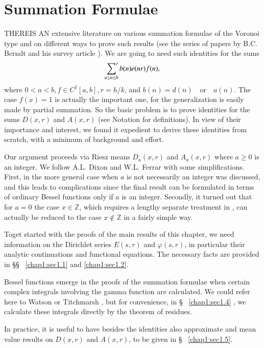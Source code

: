 
\chapter{Summation Formulae}\label{chap1}

THERE\pageoriginale IS AN extensive literature on various summation
formulae of the Voronoi type and on different ways to prove such
results (see \eg the series of papers by B.C. Berndt \cite{key3} and
his survey article \cite{key4}). We are going to need such identities
for the sums
$$
\sideset{}{'}\sum\limits_{a\leq n\leq b}b(n)e(nr)f(n),
$$
where $0<a<b, f\in C^1[a,b], r=h/k$, and $b(n)=d(n)\quad\text{or}\quad
a(n)$. The case $f(x)=1$ is actually the important one, for the
generalization is easily made by partial summation. So the basic
problem is to prove identities for the sums $D(x,r)$ and $A(x,r)$ (see
Notation for definitions). In view of their importance and interest,
we found it expedient to derive these identities from scratch, with a
minimum of background and effort.

Our argument proceeds via Riesz means $D_a(x,r)$ and $A_a(x,r)$ where
$a\geq 0$ is an integer. We follow A.L. Dixon and W.L. Ferrar
\cite{key6} with some simplifications. First, in \cite{key6} the more
general case when $a$ is not necessarily an integer was discussed, and
this leads to complications since the final result can be formulated
in terms of ordinary Bessel functions only if $a$ is an
integer. Secondly, it turned out that for $a=0$ the case $x\in
\mathbb{Z}$, which requires a lengthy separate treatment in
\cite{key6}, can actually be reduced to the case $x\notin \mathbb{Z}$
in a fairly simple way. 

To\pageoriginale get started with the proofs of the main results of
this chapter, we need information on the Dirichlet series $E(s,r)$ and
$\varphi(s,r)$, in particular their analytic continuations and
functional equations. The necessary facts are provided in \S\S ~
\ref{chap1:sec1.1} and \ref{chap1:sec1.2}.

Bessel functions emerge in the proofs of the summation formulae when
certain complex integrals involving the gamma function are
calculated. We could refer here to Watson \cite{key29} or Titchmarsh
\cite{key26}, but for convenience, in \S ~ \ref{chap1:sec1.4} , we
calculate these integrals directly by the theorem of residues.

In practice, it is useful to have besides the identities also
approximate and mean value results on $D(x,r)$ and $A(x,r)$, to be
given in \S ~ \ref{chap1:sec1.5}.

